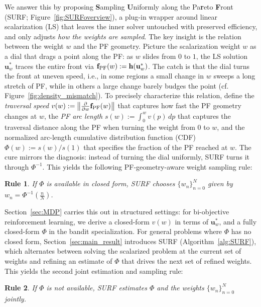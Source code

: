 \documentclass{article}
\newtheorem{principle}{Rule}
\newcommand{\bu}{\mathbf{u}}
\newcommand{\h}{\mathbf{h}}
\newcommand{\fPF}{{\mathbf{f}_{\rm PF}}}
\newcommand{\Farc}{\Phi}
\begin{document}
We answer this by proposing \textbf{S}ampling \textbf{U}niformly along the Pa\textbf{r}eto \textbf{F}ront (SURF; Figure~\ref{fig:SURFoverview}), a plug-in wrapper around linear scalarization (LS) that leaves the inner solver untouched with preserved efficiency, and only adjusts \emph{how the weights are sampled}. The key insight is the relation between the weight $w$ and the PF geometry. Picture the scalarization weight $w$ as a dial that drags a point along the PF: as $w$ slides from $0$ to $1$, the LS solution $\bu_w^*$ traces the entire front via $\fPF(w):=\h(\bu_w^*)$. The catch is that the dial turns the front at uneven speed, i.e., in some regions a small change in $w$ sweeps a long stretch of PF, while in others a large change barely budges the point (cf. Figure~\ref{fig:density_mismatch}). 
To precisely characterize this relation, define the \emph{traversal speed} $v(w):=\bigl\|\tfrac{\partial}{\partial w}\fPF(w)\bigr\|$ that captures how fast the PF geometry changes at $w$, the \emph{PF arc length} $s(w):=\int_0^w v(p)\,dp$ that captures the traversal distance along the PF when turning the weight from $0$ to $w$, and the normalized arc-length cumulative distribution function (CDF) $\Farc(w):=s(w)/s(1)$ that specifies the fraction of the PF reached at $w$. The cure mirrors the diagnosis: instead of turning the dial uniformly, SURF turns it through $\Farc^{-1}$. This yields the following PF-geometry-aware weight sampling rule: 


\vspace{-0.1cm}
\begin{leftrulebox}
\begin{principle}
\label{prin:pf_aware_ls_weighting}
If $\Farc$ is available in closed form, SURF chooses $\{w_n\}_{n=0}^N$ given by $w_n=\Farc^{-1} \left(\frac{n}{N}\right)$.
\end{principle}
\end{leftrulebox}
Section~\ref{sec:MDP} carries this out in structured settings: for bi-objective reinforcement learning, 
we derive a closed-form $v(w)$ in terms of $\bu_w^*$, and a fully closed-form $\Farc$ in the bandit specialization. For general problems where $\Farc$ has no closed form, Section~\ref{sec:main_result} introduces SURF (Algorithm~\ref{alg:SURF}), which alternates between solving the scalarized problem at the current set of weights and refining an estimate of $\Farc$ that drives the next set of refined weights. This yields the second joint estimation and sampling rule:
\vspace{-0.1cm}
\begin{leftrulebox} 
\begin{principle}
\label{prin:surf_general}
If $\Farc$ is not available, SURF estimates $\Farc$ and the weights $\{w_n\}_{n=0}^N$ jointly.
\end{principle}
\end{leftrulebox}
\end{document}
